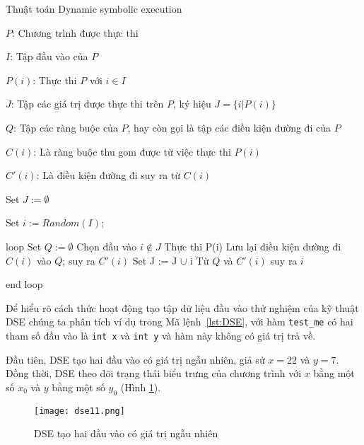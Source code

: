 \begin{algorithm}
	\caption{Thuật toán Dynamic symbolic execution}
	\label{alg:DSE}
	\begin{algorithmic}
		\item $ P $: Chương trình được thực thi		
		\item $ I $: Tập đầu vào của $ P $		
		\item $ P(i)$: Thực thi $ P $ với $ i \in I  $
		\item $ J $: Tập các giá trị được thực thi trên $ P $, ký hiệu $ J = \{i | P(i)\} $
		\item $ Q $: Tập các ràng buộc của $ P $, hay còn gọi là tập các điều kiện đường đi của $ P $
		\item $ C(i) $: Là ràng buộc thu gom được từ việc thực thi $ P(i)$
		\item $ C'(i) $: Là điều kiện đường đi suy ra từ $ C(i) $
        \item Set $J:= \emptyset$
        \item Set $i:= Random(I) $; 
        \item loop 
        	\subitem Set $ Q:= \emptyset$
        	\subitem Chọn đầu vào $ i \notin J $
          	\subitem Thực thi P(i) 
          	\subitem Lưu lại điều kiện đường đi $ C(i) $ vào $ Q $; suy ra $ C'(i)$ 	        
          	\subitem Set J := J $\cup $ i
          	\subitem Từ $ Q $ và $ C'(i) $ suy ra $ i $
        \item end loop
	\end{algorithmic}
\end{algorithm}

Để hiểu rõ cách thức hoạt động tạo tập dữ liệu đầu vào thử nghiệm của kỹ thuật DSE chúng ta phân tích ví dụ trong Mã lệnh~\ref{lst:DSE}, với hàm \texttt{test\_me} có hai tham số đầu vào là \texttt{int x} và \texttt{int y} và hàm này không có giá trị trả về.

	

Đầu tiên, DSE tạo hai đầu vào có giá trị ngẫu nhiên, giả sử $ x = 22 $ và $ y = 7 $. Đồng thời, DSE theo dõi trạng thái biểu trưng của chương trình với $ x $  bằng một số $ x_{0} $ và $ y $ bằng một số $ y_{0} $ (Hình \ref{fig:dse11}).

\begin{figure}[H]	
	\begin{center}
		\texttt{[image: dse11.png]}
	\end{center}
	\caption{DSE tạo hai đầu vào có giá trị ngẫu nhiên}
	\label{fig:dse11}	
\end{figure}

